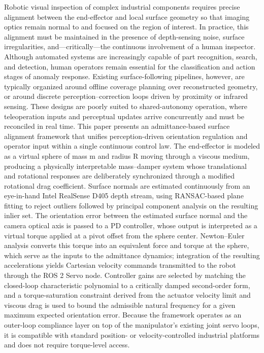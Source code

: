 Robotic visual inspection of complex industrial components requires precise alignment between the end-effector and local surface geometry so that imaging optics remain normal to and focused on the region of interest. In practice, this alignment must be maintained in the presence of depth-sensing noise, surface irregularities, and—critically—the continuous involvement of a human inspector. Although automated systems are increasingly capable of part recognition, search, and detection, human operators remain essential for the classification and action stages of anomaly response. Existing surface-following pipelines, however, are typically organized around offline coverage planning over reconstructed geometry, or around discrete perception–correction loops driven by proximity or infrared sensing. These designs are poorly suited to shared-autonomy operation, where teleoperation inputs and perceptual updates arrive concurrently and must be reconciled in real time.
This paper presents an admittance-based surface alignment framework that unifies perception-driven orientation regulation and operator input within a single continuous control law. The end-effector is modeled as a virtual sphere of mass m and radius R moving through a viscous medium, producing a physically interpretable mass–damper system whose translational and rotational responses are deliberately synchronized through a modified rotational drag coefficient. Surface normals are estimated continuously from an eye-in-hand Intel RealSense D405 depth stream, using RANSAC-based plane fitting to reject outliers followed by principal component analysis on the resulting inlier set. The orientation error between the estimated surface normal and the camera optical axis is passed to a PD controller, whose output is interpreted as a virtual torque applied at a pivot offset from the sphere center. Newton–Euler analysis converts this torque into an equivalent force and torque at the sphere, which serve as the inputs to the admittance dynamics; integration of the resulting accelerations yields Cartesian velocity commands transmitted to the robot through the ROS 2 Servo node.
Controller gains are selected by matching the closed-loop characteristic polynomial to a critically damped second-order form, and a torque-saturation constraint derived from the actuator velocity limit and viscous drag is used to bound the admissible natural frequency for a given maximum expected orientation error. Because the framework operates as an outer-loop compliance layer on top of the manipulator's existing joint servo loops, it is compatible with standard position- or velocity-controlled industrial platforms and does not require torque-level access.
